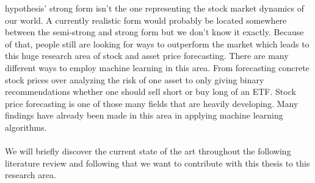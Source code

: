 \documentclass[a4paper,12pt]{report}
\begin{document}
hypothesis’ strong form isn’t the one representing the stock market dynamics of our world. A currently realistic form would probably be located somewhere between the semi-strong and strong form but we don’t know it exactly. Because of that, people still are looking for ways to outperform the market which leads to this huge research area of stock and asset price forecasting. There are many different ways to employ machine learning in this area. From forecasting concrete stock prices over analyzing the risk of one asset to only giving binary recommendations whether one should sell short or buy long of an ETF. Stock price forecasting is one of those many fields that are heavily developing. Many findings have already been made in this area in applying machine learning algorithms. \\
\\
We will briefly discover the current state of the art throughout the following literature review and following that we want to contribute with this thesis to this research area.
\end{document}

